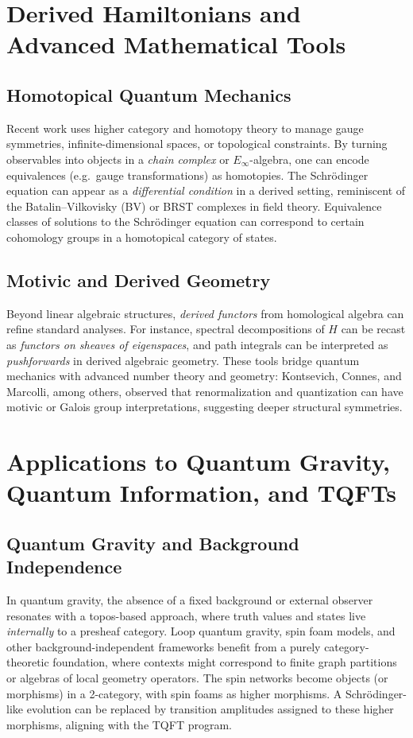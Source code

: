 \documentclass[12pt]{article}
\begin{document}
\section{Derived Hamiltonians and Advanced Mathematical Tools}
\subsection{Homotopical Quantum Mechanics}
Recent work uses higher category and homotopy theory to manage
gauge symmetries, infinite-dimensional spaces, or topological
constraints. By turning observables into objects in a \emph{chain
complex} or $E_\infty$-algebra, one can encode equivalences
(e.g.\ gauge transformations) as homotopies. The Schr\"odinger
equation can appear as a \emph{differential condition} in a derived
setting, reminiscent of the Batalin--Vilkovisky (BV) or BRST
complexes in field theory. Equivalence classes of solutions to
the Schr\"odinger equation can correspond to certain cohomology
groups in a homotopical category of states.

\subsection{Motivic and Derived Geometry}
Beyond linear algebraic structures, \emph{derived functors} from
homological algebra can refine standard analyses. For instance,
spectral decompositions of $H$ can be recast as \emph{functors on
sheaves of eigenspaces}, and path integrals can be interpreted as
\emph{pushforwards} in derived algebraic geometry. These tools
bridge quantum mechanics with advanced number theory and geometry:
Kontsevich, Connes, and Marcolli, among others, observed that
renormalization and quantization can have motivic or Galois group
interpretations, suggesting deeper structural symmetries.

\section{Applications to Quantum Gravity, Quantum Information, and TQFTs}
\subsection{Quantum Gravity and Background Independence}
In quantum gravity, the absence of a fixed background or external
observer resonates with a topos-based approach, where truth values
and states live \emph{internally} to a presheaf category. Loop
quantum gravity, spin foam models, and other background-independent
frameworks benefit from a purely category-theoretic foundation,
where contexts might correspond to finite graph partitions or
algebras of local geometry operators. The spin networks become
objects (or morphisms) in a 2-category, with spin foams as higher
morphisms. A Schr\"odinger-like evolution can be replaced by
transition amplitudes assigned to these higher morphisms, aligning
with the TQFT program.
\end{document}
